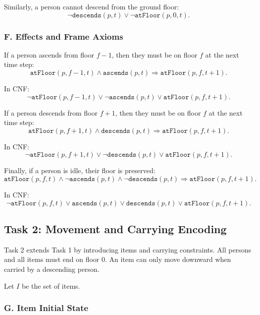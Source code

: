 \noindent Similarly, a person cannot descend from the ground floor:
\[
    \neg \texttt{descends}(p,t)
    \lor
    \neg \texttt{atFloor}(p,0,t).
\]

\subsubsection*{F. Effects and Frame Axioms}

If a person ascends from floor $f-1$, then they must be on floor $f$ at the next time step:
\[
    \texttt{atFloor}(p,f-1,t) \land \texttt{ascends}(p,t)
    \Rightarrow
    \texttt{atFloor}(p,f,t+1).
\]

\noindent In CNF:
\[
    \neg \texttt{atFloor}(p,f-1,t)
    \lor
    \neg \texttt{ascends}(p,t)
    \lor
    \texttt{atFloor}(p,f,t+1).
\]

\noindent If a person descends from floor $f+1$, then they must be on floor $f$ at the next time step:
\[
    \texttt{atFloor}(p,f+1,t) \land \texttt{descends}(p,t)
    \Rightarrow
    \texttt{atFloor}(p,f,t+1).
\]

\noindent In CNF:
\[
    \neg \texttt{atFloor}(p,f+1,t)
    \lor
    \neg \texttt{descends}(p,t)
    \lor
    \texttt{atFloor}(p,f,t+1).
\]

\noindent Finally, if a person is idle, their floor is preserved:
\[
    \texttt{atFloor}(p,f,t)
    \land
    \neg \texttt{ascends}(p,t)
    \land
    \neg \texttt{descends}(p,t)
    \Rightarrow
    \texttt{atFloor}(p,f,t+1).
\]

\noindent In CNF:
\[
    \neg \texttt{atFloor}(p,f,t)
    \lor
    \texttt{ascends}(p,t)
    \lor
    \texttt{descends}(p,t)
    \lor
    \texttt{atFloor}(p,f,t+1).
\]

\subsection{Task 2: Movement and Carrying Encoding} \label{subsec:task-2:-movement-and-carrying-encoding}

Task 2 extends Task 1 by introducing items and carrying constraints.
All persons and all items must end on floor $0$.
An item can only move downward when carried by a descending person.

\noindent Let $I$ be the set of items.

\subsubsection*{G. Item Initial State}


